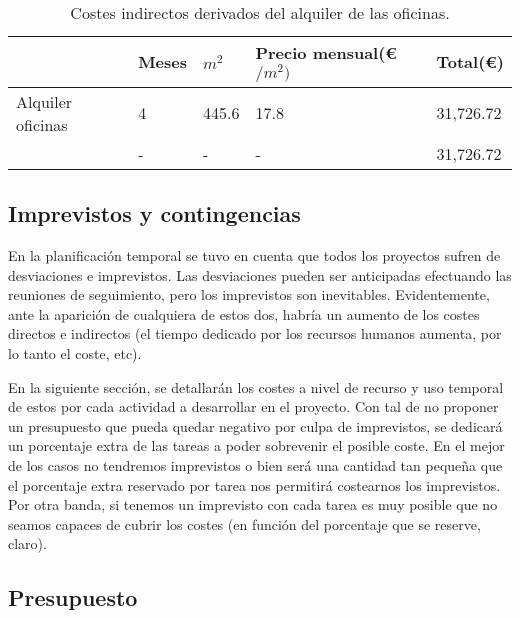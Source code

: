 \begin{table}[H]
\begin{tabular}{l|l|l|l|l|}
\cline{2-5}
                                                    & Meses   & $m^{2}$ & Precio mensual(\euro$/m^{2})$ & Total(\euro) \\ \hline
\multicolumn{1}{|l|}{Alquiler oficinas }            & 4  & 445.6   & 17.8 & 31,726.72     \\ \hline
\rowcolor{gray!50}
\multicolumn{1}{|l|}{Total} & - &   -       &  -              &   31,726.72       \\ \hline
\end{tabular}
\caption{Costes indirectos derivados del alquiler de las oficinas.}
\end{table}

\subsection{Imprevistos y contingencias}

En la planificación temporal se tuvo en cuenta que todos los proyectos sufren de desviaciones e imprevistos. Las desviaciones pueden ser anticipadas efectuando las reuniones de seguimiento, pero los imprevistos son inevitables. Evidentemente, ante la aparición de cualquiera de estos dos, habría un aumento de los costes directos e indirectos (el tiempo dedicado por los recursos humanos aumenta, por lo tanto el coste, etc).
\par\medskip
En la siguiente sección, se detallarán los costes a nivel de recurso y uso temporal de estos por cada actividad a desarrollar en el proyecto. Con tal de no proponer un presupuesto que pueda quedar negativo por culpa de imprevistos, se dedicará un porcentaje extra de las tareas a poder sobrevenir el posible coste.
En el mejor de los casos no tendremos imprevistos o bien será una cantidad tan pequeña que el porcentaje extra reservado por tarea nos permitirá costearnos los imprevistos. Por otra banda, si tenemos un imprevisto con cada tarea es muy posible que no seamos capaces de cubrir los costes (en función del porcentaje que se reserve, claro).

\subsection{Presupuesto}


